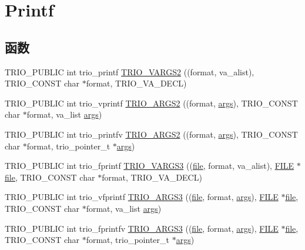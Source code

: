 \hypertarget{group___printf}{}\section{Printf}
\label{group___printf}
\subsection*{函数}
\begin{DoxyCompactItemize}
\item 
T\+R\+I\+O\+\_\+\+P\+U\+B\+L\+IC int trio\+\_\+printf \hyperlink{group___printf_gaed17251b0f7e8f42cb5ddeb74feef6f7}{T\+R\+I\+O\+\_\+\+V\+A\+R\+G\+S2} ((format, va\+\_\+alist), T\+R\+I\+O\+\_\+\+C\+O\+N\+ST char $\ast$format, T\+R\+I\+O\+\_\+\+V\+A\+\_\+\+D\+E\+CL)
\item 
T\+R\+I\+O\+\_\+\+P\+U\+B\+L\+IC int trio\+\_\+vprintf \hyperlink{group___printf_ga1b4cbeca40314883d90a26034076651b}{T\+R\+I\+O\+\_\+\+A\+R\+G\+S2} ((format, \hyperlink{structargs}{args}), T\+R\+I\+O\+\_\+\+C\+O\+N\+ST char $\ast$format, va\+\_\+list \hyperlink{structargs}{args})
\item 
T\+R\+I\+O\+\_\+\+P\+U\+B\+L\+IC int trio\+\_\+printfv \hyperlink{group___printf_gafdccde42df6e234ff1fd0b065494addc}{T\+R\+I\+O\+\_\+\+A\+R\+G\+S2} ((format, \hyperlink{structargs}{args}), T\+R\+I\+O\+\_\+\+C\+O\+N\+ST char $\ast$format, trio\+\_\+pointer\+\_\+t $\ast$\hyperlink{structargs}{args})
\item 
T\+R\+I\+O\+\_\+\+P\+U\+B\+L\+IC int trio\+\_\+fprintf \hyperlink{group___printf_gada44b3387088f4aff6b57bc324fba8c1}{T\+R\+I\+O\+\_\+\+V\+A\+R\+G\+S3} ((\hyperlink{structfile}{file}, format, va\+\_\+alist), \hyperlink{struct__iobuf}{F\+I\+LE} $\ast$\hyperlink{structfile}{file}, T\+R\+I\+O\+\_\+\+C\+O\+N\+ST char $\ast$format, T\+R\+I\+O\+\_\+\+V\+A\+\_\+\+D\+E\+CL)
\item 
T\+R\+I\+O\+\_\+\+P\+U\+B\+L\+IC int trio\+\_\+vfprintf \hyperlink{group___printf_ga68754f77b19801518809f3c14c9df557}{T\+R\+I\+O\+\_\+\+A\+R\+G\+S3} ((\hyperlink{structfile}{file}, format, \hyperlink{structargs}{args}), \hyperlink{struct__iobuf}{F\+I\+LE} $\ast$\hyperlink{structfile}{file}, T\+R\+I\+O\+\_\+\+C\+O\+N\+ST char $\ast$format, va\+\_\+list \hyperlink{structargs}{args})
\item 
T\+R\+I\+O\+\_\+\+P\+U\+B\+L\+IC int trio\+\_\+fprintfv \hyperlink{group___printf_gaf01545f1b005bd19669cb5c54cccedd2}{T\+R\+I\+O\+\_\+\+A\+R\+G\+S3} ((\hyperlink{structfile}{file}, format, \hyperlink{structargs}{args}), \hyperlink{struct__iobuf}{F\+I\+LE} $\ast$\hyperlink{structfile}{file}, T\+R\+I\+O\+\_\+\+C\+O\+N\+ST char $\ast$format, trio\+\_\+pointer\+\_\+t $\ast$\hyperlink{structargs}{args})

\end{DoxyCompactItemize}
